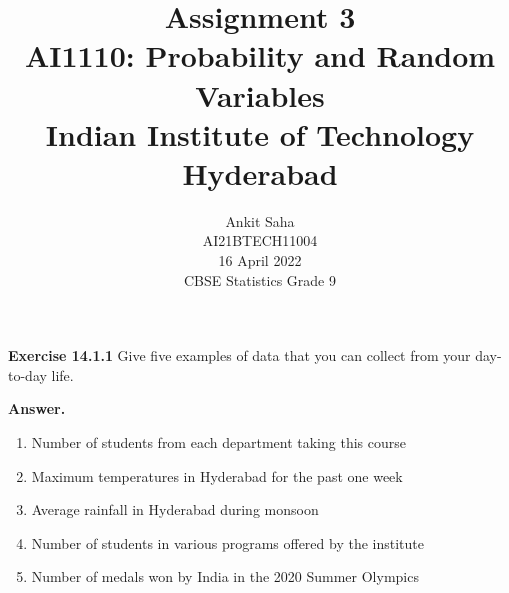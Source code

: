 \documentclass[journal,12pt,twocolumn]{IEEEtran}
\title{Assignment 3 \\ \Large AI1110: Probability and Random Variables \\ \large Indian Institute of Technology Hyderabad}
\author{Ankit Saha \\ \normalsize AI21BTECH11004 \\ \vspace*{20pt} \normalsize  16 April 2022 \\ \vspace*{20pt} \Large CBSE Statistics Grade 9}
\begin{document}
	\maketitle
	
	\textbf{Exercise 14.1.1} 
	Give five examples of data that you can collect from your day-to-day life.
	
	\textbf{Answer.}		
	\begin{enumerate}[label=\roman*)]
	\item Number of students from each department taking this course
	\begin{table}[ht!]
		\centering
		
		\caption{}
		\label{table:table1}	
	\end{table}
	
	\item Maximum temperatures in Hyderabad for the past one week
	\begin{table}[ht!]
		\centering
		
		\caption{}
		\label{table:table2}	
	\end{table}
	
	\item Average rainfall in Hyderabad during monsoon
	\begin{table}[ht!]
		\centering
		
		\caption{}
		\label{table:table3}	
	\end{table}
	
	\item Number of students in various programs offered by the institute
	\begin{table}[ht!]
		\centering
		
		\caption{}
		\label{table:table4}	
	\end{table}
	
	\item Number of medals won by India in the 2020 Summer Olympics
	\begin{table}[ht!]
		\centering
		
		\caption{}
		\label{table:table5}	
	\end{table}
	
	\end{enumerate}

	
\end{document}

